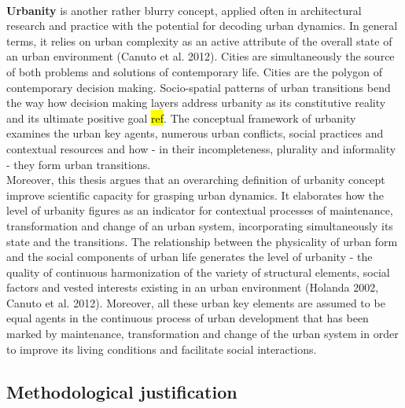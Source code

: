 \documentclass[11pt]{report}
\begin{document}
\\
\textbf{Urbanity} is another rather blurry concept, applied often in architectural research and practice with the potential for decoding urban dynamics. In general terms, it relies on urban complexity as an active attribute of the overall state of an urban environment (Canuto et al. 2012). Cities are simultaneously the source of both problems and solutions of contemporary life. Cities are the polygon of contemporary decision making. Socio-spatial patterns of urban transitions bend the way how decision making layers address urbanity as its constitutive reality and its ultimate positive goal \hl{ref}. The conceptual framework of urbanity examines the urban key agents, numerous urban conflicts, social practices and contextual resources and how - in their incompleteness, plurality and informality - they form urban transitions.
\\
Moreover, this thesis argues that an overarching definition of urbanity concept improve scientific capacity for grasping urban dynamics. It elaborates how the level of urbanity figures as an indicator for contextual processes of maintenance, transformation and change of an urban system, incorporating simultaneously its state and the transitions. The relationship between the physicality of urban form and the social components of urban life generates the level of urbanity - the quality of continuous harmonization of the variety of structural elements, social factors and vested interests existing in an urban environment (Holanda 2002, Canuto et al. 2012). Moreover, all these urban key elements are assumed to be equal agents in the continuous process of urban development that has been marked by maintenance, transformation and change of the urban system in order to improve its living conditions and facilitate social interactions.

\subsection{Methodological justification}
\end{document}

